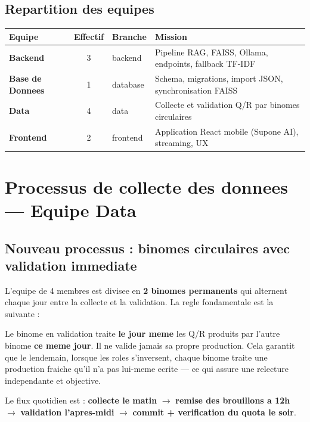 \documentclass[11pt,a4paper]{article}
\begin{document}
\subsection{Repartition des equipes}

\begin{center}
\begin{tabular}{>{\bfseries}l c >{\ttfamily}l p{6.5cm}}
\toprule
Equipe & Effectif & Branche & Mission \\
\midrule
Backend & 3 & backend & Pipeline RAG, FAISS, Ollama, endpoints, fallback TF-IDF \\
Base de Donnees & 1 & database & Schema, migrations, import JSON, synchronisation FAISS \\
Data & 4 & data & Collecte et validation Q/R par binomes circulaires \\
Frontend & 2 & frontend & Application React mobile (Supone AI), streaming, UX \\
\bottomrule
\end{tabular}
\end{center}

\clearpage

\section{Processus de collecte des donnees --- Equipe Data}

\subsection{Nouveau processus : binomes circulaires avec validation immediate}

L'equipe de 4 membres est divisee en \textbf{2 binomes permanents} qui alternent chaque jour entre la collecte et la validation. La regle fondamentale est la suivante :

\begin{important}
Le binome en validation traite \textbf{le jour meme} les Q/R produits par l'autre binome \textbf{ce meme jour}. Il ne valide jamais sa propre production. Cela garantit que le lendemain, lorsque les roles s'inversent, chaque binome traite une production fraiche qu'il n'a pas lui-meme ecrite --- ce qui assure une relecture independante et objective.

Le flux quotidien est : \textbf{collecte le matin} $\rightarrow$ \textbf{remise des brouillons a 12h} $\rightarrow$ \textbf{validation l'apres-midi} $\rightarrow$ \textbf{commit + verification du quota le soir}.
\end{important}
\end{document}
